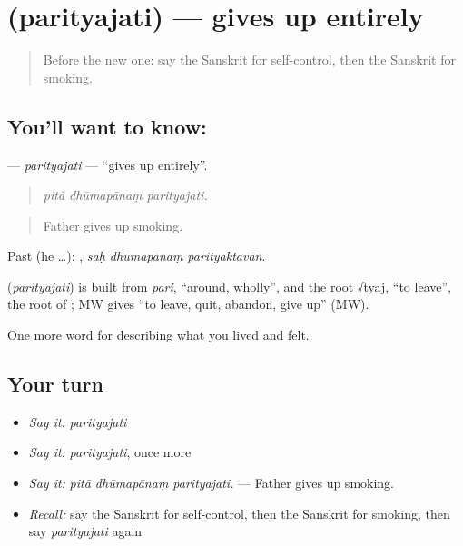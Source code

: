 \section[\texorpdfstring{\sk{परित्यजति} (parityajati)}{परित्यजति (parityajati)}]{ (parityajati) — gives up entirely}

\label{lesson:SA-C489-parityajati}



\begin{quote}
Before the new one: say the Sanskrit for self-control, then the Sanskrit for smoking.
\end{quote}

\subsection*{You'll want to know: }
\textbf{} — \emph{parityajati} — \textquotedblleft{}gives up entirely\textquotedblright{}.

\begin{quote}
  
\end{quote}

\begin{quote}
\emph{pitā dhūmapānaṃ parityajati.}
\end{quote}

\begin{quote}
Father gives up smoking.
\end{quote}

Past (he …):   , \emph{saḥ dhūmapānaṃ parityaktavān}.

\begin{cousinweb}
\textbf{} (\emph{parityajati}) is built from \emph{pari}, \textquotedblleft{}around, wholly\textquotedblright{}, and the root √tyaj, \textquotedblleft{}to leave\textquotedblright{}, the root of \textbf{}; MW gives \textquotedblleft{}to leave, quit, abandon, give up\textquotedblright{} (MW).
\end{cousinweb}

\begin{grammarlens}[title={What you've built}]
One more word for describing what you lived and felt.
\end{grammarlens}

\subsection*{Your turn}
\begin{itemize}
\raggedright
  \item \emph{Say it:} \emph{parityajati}
  \item \emph{Say it:} \emph{parityajati}, once more
  \item \emph{Say it:} \emph{pitā dhūmapānaṃ parityajati.} — Father gives up smoking.
  \item \emph{Recall:} say the Sanskrit for self-control, then the Sanskrit for smoking, then say \emph{parityajati} again
\end{itemize}

